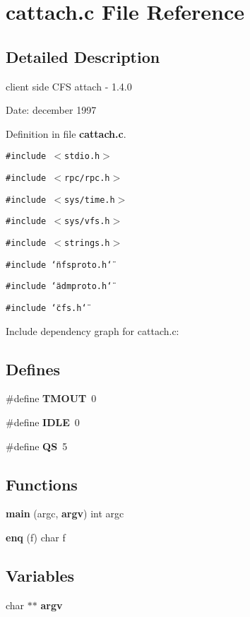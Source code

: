 \section{cattach.c File Reference}
\label{cattach_8c}


\subsection{Detailed Description}
client side CFS attach - 1.4.0

\begin{Desc}
\item[Date:]december 1997\end{Desc}


Definition in file {\bf cattach.c}.

{\tt \#include $<$stdio.h$>$}\par
{\tt \#include $<$rpc/rpc.h$>$}\par
{\tt \#include $<$sys/time.h$>$}\par
{\tt \#include $<$sys/vfs.h$>$}\par
{\tt \#include $<$strings.h$>$}\par
{\tt \#include \char`\"{}nfsproto.h\char`\"{}}\par
{\tt \#include \char`\"{}admproto.h\char`\"{}}\par
{\tt \#include \char`\"{}cfs.h\char`\"{}}\par


Include dependency graph for cattach.c:\subsection*{Defines}
\begin{CompactItemize}
\item 
\#define {\bf TMOUT}\ 0
\item 
\#define {\bf IDLE}\ 0
\item 
\#define {\bf QS}\ 5
\end{CompactItemize}
\subsection*{Functions}
\begin{CompactItemize}
\item 
{\bf main} (argc, {\bf argv}) int argc
\item 
{\bf enq} (f) char f
\end{CompactItemize}
\subsection*{Variables}
\begin{CompactItemize}
\item 
char $\ast$$\ast$ {\bf argv}
\end{CompactItemize}


